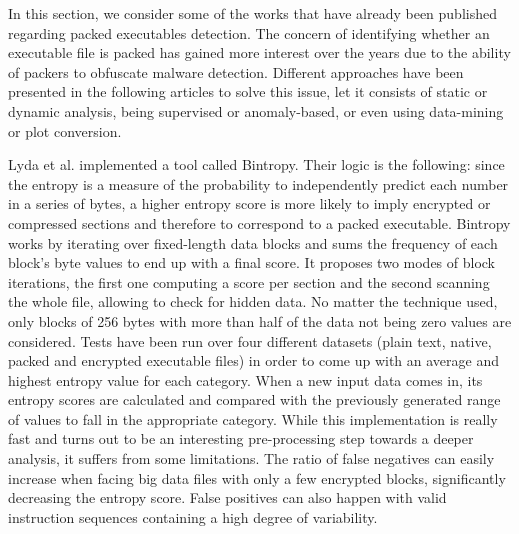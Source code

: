 In this section, we consider some of the works that have already been published regarding packed executables detection. The concern of identifying whether an executable file is packed has gained more interest over the years due to the ability of packers to obfuscate malware detection. Different approaches have been presented in the following articles to solve this issue, let it consists of static or dynamic analysis, being supervised or anomaly-based, or even using data-mining or plot conversion.

Lyda et al. \cite{lyda_using_2007} implemented a tool called Bintropy. Their logic is the following: since the entropy is a measure of the probability to independently predict each number in a series of bytes, a higher entropy score is more likely to imply encrypted or compressed sections and therefore to correspond to a packed executable. Bintropy works by iterating over fixed-length data blocks and sums the frequency of each block’s byte values to end up with a final score. It proposes two modes of block iterations, the first one computing a score per section and the second scanning the whole file, allowing to check for hidden data. No matter the technique used, only blocks of 256 bytes with more than half of the data not being zero values are considered. Tests have been run over four different datasets (plain text, native, packed and encrypted executable files) in order to come up with an average and highest entropy value for each category. When a new input data comes in, its entropy scores are calculated and compared with the previously generated range of values to fall in the appropriate category. While this implementation is really fast and turns out to be an interesting pre-processing step towards a deeper analysis, it suffers from some limitations. The ratio of false negatives can easily increase when facing big data files with only a few encrypted blocks, significantly decreasing the entropy score. False positives can also happen with valid instruction sequences containing a high degree of variability.

